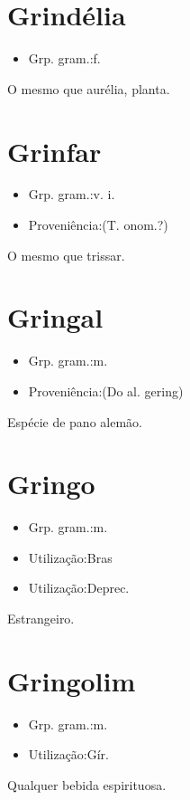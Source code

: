 \section{Grindélia}
\begin{itemize}
\item {Grp. gram.:f.}
\end{itemize}
O mesmo que \textunderscore aurélia\textunderscore , planta.
\section{Grinfar}
\begin{itemize}
\item {Grp. gram.:v. i.}
\end{itemize}
\begin{itemize}
\item {Proveniência:(T. onom.?)}
\end{itemize}
O mesmo que \textunderscore trissar\textunderscore .
\section{Gringal}
\begin{itemize}
\item {Grp. gram.:m.}
\end{itemize}
\begin{itemize}
\item {Proveniência:(Do al. \textunderscore gering\textunderscore )}
\end{itemize}
Espécie de pano alemão.
\section{Gringo}
\begin{itemize}
\item {Grp. gram.:m.}
\end{itemize}
\begin{itemize}
\item {Utilização:Bras}
\end{itemize}
\begin{itemize}
\item {Utilização:Deprec.}
\end{itemize}
Estrangeiro.
\section{Gringolim}
\begin{itemize}
\item {Grp. gram.:m.}
\end{itemize}
\begin{itemize}
\item {Utilização:Gír.}
\end{itemize}
Qualquer bebida espirituosa.
